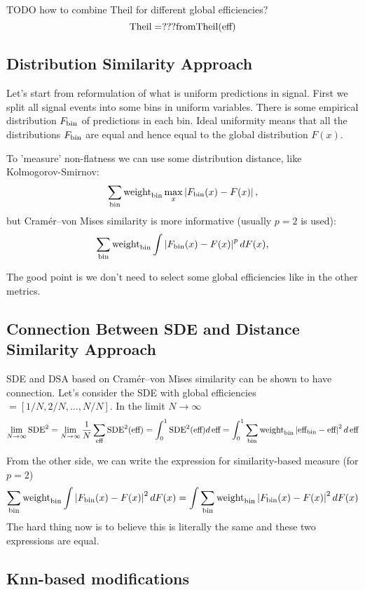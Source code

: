 \documentclass[12pt]{article}
\theoremstyle{definition}
\theoremstyle{remark}
\newcommand{\abs}[1]{\left\vert#1\right\vert}
\begin{document}
TODO how to combine Theil for different global efficiencies?
\[
	\text{Theil} = ??? \text{from} \text{Theil}(\text{eff})
\]

\subsection{Distribution Similarity Approach}
\label{subsection:similarity}

Let's start from reformulation of what is uniform predictions in signal. First we split all signal events into some bins in uniform variables. There is some empirical distribution $F_{\text{bin}}$ of predictions in each bin. Ideal uniformity means that all the distributions $F_{\text{bin}}$ are equal and hence equal to the global distribution $F(x)$. 

To 'measure' non-flatness we can use some distribution distance, like Kolmogorov-Smirnov:
\[
	 \sum_{\bin} \binweight \max_x \abs{F_{\bin}(x) - F(x)},
\]
but Cram\'er--von Mises similarity is more informative (usually $p=2$ is used):
\[
	 \sum_{\bin} \binweight \int \abs{F_{\bin}(x) - F(x)}^p dF(x),
\]

The good point is we don't need to select some global efficiencies like in the other metrics.


\subsection{Connection Between SDE and Distance Similarity Approach}

SDE and DSA based on Cram\'er--von Mises similarity can be shown to have connection.
Let's consider the SDE with global efficiencies $= [1/N, 2/N, \dots, N/N]$. In the limit $N \to \infty$
\[
	\lim_{N \to \infty} \SDE^2 = 
	\lim_{N \to \infty} \frac{1}{N} \sum_{\globaleff}\SDE^2(\globaleff) = 
	\int_0^1 \SDE^2(\globaleff) d\, \globaleff = 
	\int_0^1 \sum_{\bin} \binweight \abs{\bineff - \globaleff}^2 d\, \globaleff
\]

From the other side, we can write the expression for similarity-based measure (for $p=2$) 
\[
	\sum_{\bin} \binweight \int \abs{F_\text{bin}(x) - F(x)}^2 dF(x) =
	\int \sum_{\bin} \binweight \abs{F_\text{bin}(x) - F(x)}^2 dF(x) 
\] The hard thing now is to believe this is literally the same and these two expressions are equal.


\subsection{Knn-based modifications}
\end{document}
